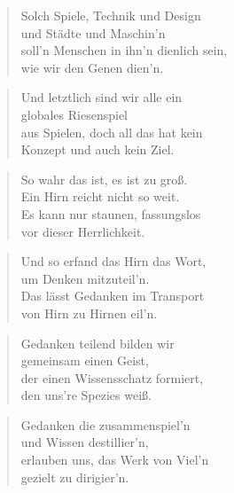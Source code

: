 \documentclass[10pt,a4paper]{article}
\begin{document}
\begin{multicols}{2}
\begin{verse}
Solch Spiele, Technik und Design \\
und Städte und Maschin’n \\
soll’n Menschen in ihn’n dienlich sein, \\
wie wir den Genen dien’n. \\
\end{verse}

\begin{verse}
Und letztlich sind wir alle ein \\
globales Riesenspiel \\
aus Spielen, doch all das hat kein \\
Konzept und auch kein Ziel. \\
\end{verse}

\begin{verse}
So wahr das ist, es ist zu groß. \\
Ein Hirn reicht nicht so weit. \\
Es kann nur staunen, fassungslos \\
vor dieser Herrlichkeit. \\
\end{verse}

\begin{verse}
Und so erfand das Hirn das Wort, \\
um Denken mitzuteil’n. \\
Das lässt Gedanken im Transport \\
von Hirn zu Hirnen eil’n. \\
\end{verse}

\begin{verse}
Gedanken teilend bilden wir \\
gemeinsam einen Geist, \\
der einen Wissensschatz formiert, \\
den uns’re Spezies weiß. \\
\end{verse}

\begin{verse}
Gedanken die zusammenspiel’n \\
und Wissen destillier’n, \\
erlauben uns, das Werk von Viel’n \\
gezielt zu dirigier’n. \\
\end{verse}


\end{multicols}
\end{document}
